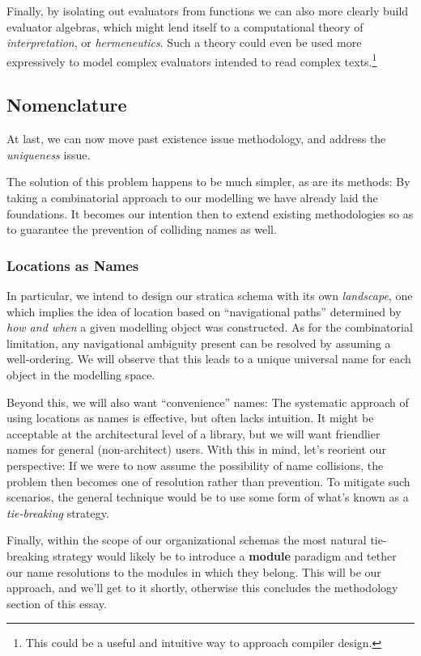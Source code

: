 \documentclass[twoside]{article}
\newcommand{\strong}[1]{{\bfseries #1}}
\begin{document}
Finally, by isolating out evaluators from functions we can also more clearly build evaluator algebras, which might lend
itself to a computational theory of \emph{interpretation}, or \emph{hermeneutics}. Such a theory could even be used
more expressively to model complex evaluators intended to read complex texts.\footnote{This could be a useful and
intuitive way to approach compiler design.}

\subsection*{Nomenclature}

At last, we can now move past existence issue methodology, and address the \emph{uniqueness} issue.

The solution of this problem happens to be much simpler, as are its methods: By taking a combinatorial approach
to our modelling we have already laid the foundations. It becomes our intention then to extend existing methodologies
so as to guarantee the prevention of colliding names as well.

\subsubsection*{Locations as Names}

In particular, we intend to design our stratica schema with its own \emph{landscape}, one which implies the idea of
location based on ``navigational paths'' determined by \emph{how and when} a given modelling object was constructed.
As for the combinatorial limitation, any navigational ambiguity present can be resolved by assuming a well-ordering.
We will observe that this leads to a unique universal name for each object in the modelling space.

Beyond this, we will also want ``convenience'' names: The systematic approach of using locations as names is effective,
but often lacks intuition. It might be acceptable at the architectural level of a library, but we will want friendlier
names for general (non-architect) users. With this in mind, let's reorient our perspective: If we were to now assume
the possibility of name collisions, the problem then becomes one of resolution rather than prevention. To mitigate
such scenarios, the general technique would be to use some form of what's known as a \emph{tie-breaking} strategy.

Finally, within the scope of our organizational schemas the most natural tie-breaking strategy would likely be to
introduce a \strong{module} paradigm and tether our name resolutions to the modules in which they belong. This will
be our approach, and we'll get to it shortly, otherwise this concludes the methodology section of this essay.
\end{document}
